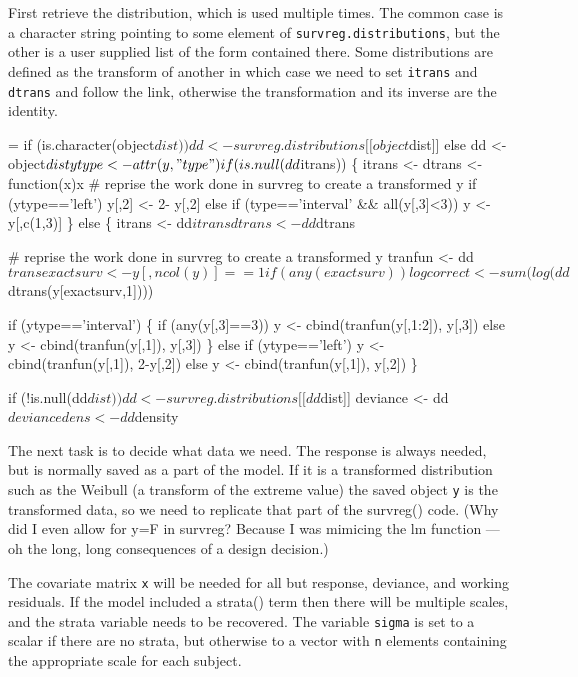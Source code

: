 \documentclass{article}
\begin{document}
First retrieve the distribution, which is used multiple times. 
The common case is a character string pointing to some element of 
\Verb!survreg.distributions!, but the other is a user supplied
list of the form contained there.
Some distributions are defined as the transform of another in which
case we need to set \Verb!itrans! and \Verb?dtrans? and follow the link,
otherwise the transformation and its inverse are the identity.
\begin{nwchunk}
=
 if (is.character(object$dist)) 
             dd <- survreg.distributions[[object$dist]]
 else dd <- object$dist
 ytype <- attr(y, "type")
 if (is.null(dd$itrans)) \{
     itrans <- dtrans <-function(x)x
     # reprise the work done in survreg to create a transformed y
     if (ytype=='left') y[,2] <- 2- y[,2]
     else if (type=='interval' && all(y[,3]<3)) y <- y[,c(1,3)]
 \}
 else \{
     itrans <- dd$itrans
     dtrans <- dd$dtrans
     
     # reprise the work done in survreg to create a transformed y
     tranfun <- dd$trans
     exactsurv <- y[,ncol(y)] ==1
     if (any(exactsurv)) logcorrect <-sum(log(dd$dtrans(y[exactsurv,1])))
 
     if (ytype=='interval') \{
         if (any(y[,3]==3))
             y <- cbind(tranfun(y[,1:2]), y[,3])
         else y <- cbind(tranfun(y[,1]), y[,3])
     \}
     else if (ytype=='left')
         y <- cbind(tranfun(y[,1]), 2-y[,2])
     else     y <- cbind(tranfun(y[,1]), y[,2])
 \}
 
 if (!is.null(dd$dist))  dd <- survreg.distributions[[dd$dist]]
 deviance <- dd$deviance
 dens <- dd$density
\end{nwchunk}

The next task is to decide what data we need.  The response
is always needed, but is normally saved as a part of the 
model.  If it is a transformed distribution such as the
Weibull (a transform of the extreme value) the saved object
\Verb!y! is the transformed data, so we need to replicate that
part of the survreg() code.  
(Why did I even allow for y=F in survreg?  Because I was
mimicing the lm function --- oh the long, long consequences of
a design decision.)

The covariate matrix \Verb!x! will be needed for all but
response, deviance, and working residuals. 
If the model
included a strata() term then there will be multiple scales,
and the strata variable needs to be recovered. 
The variable \Verb!sigma! is set to a scalar if there are no
strata, but otherwise to a vector with \Verb!n! elements containing
the appropriate scale for each subject.
\end{document}
